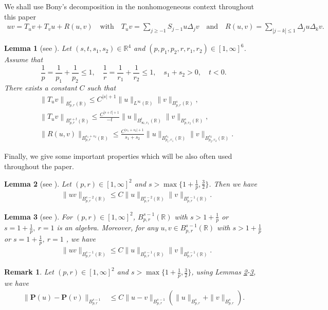 \documentclass[12pt]{article}
\newtheorem{lemma}{Lemma}[section]
\newtheorem{remark}{Remark}[section]
\newcommand{\bbal}{\begin{align*}}
\newcommand{\R}{\mathbb{R}}
\newcommand{\f}{\left}
\newcommand{\g}{\right}
\begin{document}
We shall use Bony's decomposition \cite{BCD} in the nonhomogeneous context throughout this paper
\begin{align*}
uv={T}_{u}v+{T}_{v}u+{R}(u,v)\quad\text{with}\quad
{T}_{u}v=\sum_{j\geq-1}{S}_{j-1}u{\Delta}_jv \quad\mbox{and} \quad{R}(u,v)=\sum_{|j-k|\leq1}{\Delta}_ju{\Delta}_kv.
\end{align*}
\begin{lemma} [see \cite{BCD}] \label{leem1} Let $\left(s, t, s_{1}, s_{2}\right)\in\mathbb{R}^{4}$ and $\left(p, p_{1}, p_{2}, r, r_{1}, r_{2}\right)\in[1, \infty]^{6}$. Assume that
$$
\frac{1}{p} = \frac{1}{p_{1}}+\frac{1}{p_{2}} \leq 1, \quad \frac{1}{r} =\frac{1}{r_{1}}+\frac{1}{r_{2}} \leq 1, \quad s_{1}+s_{2}>0, \quad t<0 .
$$
There exists a constant $C$ such that
\bbal
&\left\|T_{u} v\right\|_{B_{p, r}^{s}\left(\mathbb{R}\right)} \leq C^{|s|+1}\|u\|_{L^{\infty}\left(\mathbb{R}\right)}\|v\|_{B_{p, r}^{s}\left(\mathbb{R}\right)},\\
&\left\|T_{u} v\right\|_{B_{p, r}^{s+t}\left(\mathbb{R}\right)} \leq \frac{C^{|s+t|+1}}{-t}\|u\|_{B_{\infty, r_{1}}^{t}\left(\mathbb{R}\right)}\|v\|_{B_{p, r_{2}}^{s}\left(\mathbb{R}\right)},\\
&\|R(u, v)\|_{B_{p, r}^{s_{1}+s_{2}}\left(\mathbb{R}\right)} \leq \frac{C^{\left|s_{1}+s_{2}\right|+1}}{s_{1}+s_{2}}\|u\|_{B_{p_{1}, r_{1}}^{s_{1}}\left(\mathbb{R}\right)}\|v\|_{B_{p_{2}, r_{2}}^{s_{2}}\left(\mathbb{R}\right)}.
\end{align*}
\end{lemma}
Finally, we give some important properties which will be also often used throughout the paper.
\begin{lemma}[see \cite{BCD}]\label{lm2}
Let $(p,r)\in[1, \infty]^2$ and $s>\max\big\{1+\frac1p,\frac32\big\}$. Then we have
\bbal
&\|uv\|_{B^{s-2}_{p,r}(\R)}\leq C\|u\|_{B^{s-2}_{p,r}(\R)}\|v\|_{B^{s-1}_{p,r}(\R)}.
\end{align*}
\end{lemma}


\begin{lemma}[see \cite{BCD}]\label{lm3}
For $(p,r)\in[1, \infty]^2$, $B^{s-1}_{p,r}(\R)$ with $s>1+\frac{1}{p}$ or $s=1+\frac{1}{p},\ r=1$ is an algebra. Moreover, for any $u,v \in B^{s-1}_{p,r}(\R)$ with $s>1+\frac{1}{p}$ or $s=1+\frac{1}{p},\ r=1$ , we have
\bbal
&\|uv\|_{B^{s-1}_{p,r}(\R)}\leq C\|u\|_{B^{s-1}_{p,r}(\R)}\|v\|_{B^{s-1}_{p,r}(\R)}.
\end{align*}
\end{lemma}
\begin{remark}\label{re5} Let $(p,r)\in[1, \infty]^2$ and $s>\max\big\{1+\frac1p,\frac32\big\}$, using Lemmas \ref{lm2}-\ref{lm3}, we have
\begin{align*}
\|\mathbf{P}(u)-\mathbf{P}(v)\|_{B_{p, r}^{s-1}} & \leq C\|u-v\|_{B_{p, r}^{s-1}}\f(\|u\|_{B_{p, r}^{s}}+\|v\|_{B_{p, r}^{s}}\g).
\end{align*}
\end{remark}
\end{document}
